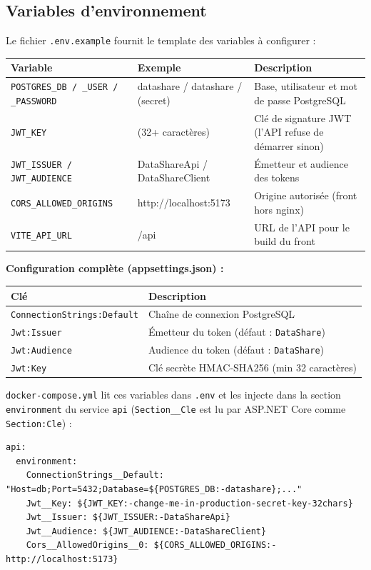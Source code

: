 \documentclass[12pt,a4paper]{article}
\begin{document}
\subsection{Variables d'environnement}

Le fichier \texttt{.env.example} fournit le template des variables \`a configurer :

\begin{longtable}{p{5cm} p{3cm} p{6cm}}
\toprule
\textbf{Variable} & \textbf{Exemple} & \textbf{Description} \\
\midrule
\endhead
\texttt{POSTGRES\_DB / \_USER / \_PASSWORD} & datashare / datashare / (secret) & Base, utilisateur et mot de passe PostgreSQL \\
\texttt{JWT\_KEY} & (32+ caract\`eres) & Cl\'e de signature JWT (l'API refuse de d\'emarrer sinon) \\
\texttt{JWT\_ISSUER / JWT\_AUDIENCE} & DataShareApi / DataShareClient & \'Emetteur et audience des tokens \\
\texttt{CORS\_ALLOWED\_ORIGINS} & http://localhost:5173 & Origine autoris\'ee (front hors nginx) \\
\texttt{VITE\_API\_URL} & /api & URL de l'API pour le build du front \\
\bottomrule
\end{longtable}

\textbf{Configuration compl\`ete (appsettings.json) :}

\begin{longtable}{p{6.5cm} p{7.5cm}}
\toprule
\textbf{Cl\'e} & \textbf{Description} \\
\midrule
\endhead
\texttt{ConnectionStrings:Default} & Cha\^ine de connexion PostgreSQL \\
\texttt{Jwt:Issuer} & \'Emetteur du token (d\'efaut : \texttt{DataShare}) \\
\texttt{Jwt:Audience} & Audience du token (d\'efaut : \texttt{DataShare}) \\
\texttt{Jwt:Key} & Cl\'e secr\`ete HMAC-SHA256 (min 32 caract\`eres) \\
\bottomrule
\end{longtable}

\texttt{docker-compose.yml} lit ces variables dans \texttt{.env} et les injecte dans la section \texttt{environment} du service \texttt{api} (\texttt{Section\_\_Cle} est lu par ASP.NET Core comme \texttt{Section:Cle}) :

\begin{lstlisting}
api:
  environment:
    ConnectionStrings__Default: "Host=db;Port=5432;Database=${POSTGRES_DB:-datashare};..."
    Jwt__Key: ${JWT_KEY:-change-me-in-production-secret-key-32chars}
    Jwt__Issuer: ${JWT_ISSUER:-DataShareApi}
    Jwt__Audience: ${JWT_AUDIENCE:-DataShareClient}
    Cors__AllowedOrigins__0: ${CORS_ALLOWED_ORIGINS:-http://localhost:5173}
\end{lstlisting}
\end{document}
